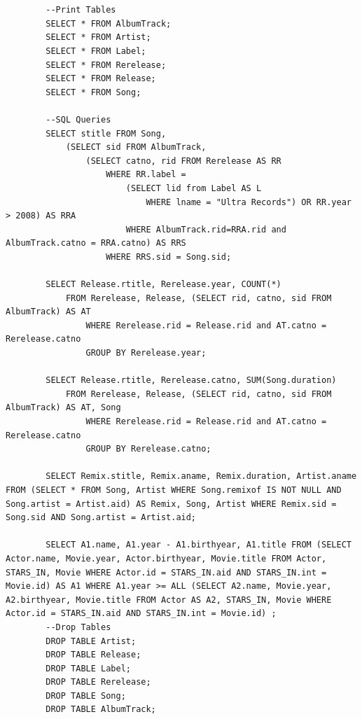 \documentclass[12pt]{article}
\begin{document}
\begin{enumerate}
\begin{verbatim}
        

        --Print Tables
        SELECT * FROM AlbumTrack;
        SELECT * FROM Artist;
        SELECT * FROM Label;
        SELECT * FROM Rerelease;
        SELECT * FROM Release;
        SELECT * FROM Song;

        --SQL Queries
        SELECT stitle FROM Song, 
            (SELECT sid FROM AlbumTrack, 
                (SELECT catno, rid FROM Rerelease AS RR 
                    WHERE RR.label = 
                        (SELECT lid from Label AS L 
                            WHERE lname = "Ultra Records") OR RR.year > 2008) AS RRA 
                        WHERE AlbumTrack.rid=RRA.rid and AlbumTrack.catno = RRA.catno) AS RRS
                    WHERE RRS.sid = Song.sid;

        SELECT Release.rtitle, Rerelease.year, COUNT(*)
            FROM Rerelease, Release, (SELECT rid, catno, sid FROM AlbumTrack) AS AT
                WHERE Rerelease.rid = Release.rid and AT.catno = Rerelease.catno
                GROUP BY Rerelease.year;
                
        SELECT Release.rtitle, Rerelease.catno, SUM(Song.duration)
            FROM Rerelease, Release, (SELECT rid, catno, sid FROM AlbumTrack) AS AT, Song
                WHERE Rerelease.rid = Release.rid and AT.catno = Rerelease.catno
                GROUP BY Rerelease.catno;

        SELECT Remix.stitle, Remix.aname, Remix.duration, Artist.aname FROM (SELECT * FROM Song, Artist WHERE Song.remixof IS NOT NULL AND Song.artist = Artist.aid) AS Remix, Song, Artist WHERE Remix.sid = Song.sid AND Song.artist = Artist.aid;

        SELECT A1.name, A1.year - A1.birthyear, A1.title FROM (SELECT Actor.name, Movie.year, Actor.birthyear, Movie.title FROM Actor, STARS_IN, Movie WHERE Actor.id = STARS_IN.aid AND STARS_IN.int = Movie.id) AS A1 WHERE A1.year >= ALL (SELECT A2.name, Movie.year, A2.birthyear, Movie.title FROM Actor AS A2, STARS_IN, Movie WHERE Actor.id = STARS_IN.aid AND STARS_IN.int = Movie.id) ;
        --Drop Tables
        DROP TABLE Artist;
        DROP TABLE Release;
        DROP TABLE Label;
        DROP TABLE Rerelease;
        DROP TABLE Song;
        DROP TABLE AlbumTrack;
\end{verbatim}
\end{enumerate}
\end{document}
